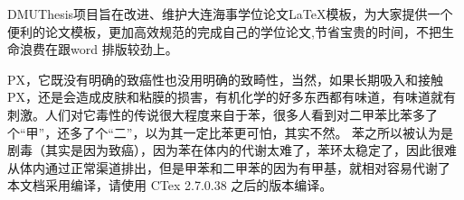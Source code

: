 \begin{abstractCn}
DMUThesis项目旨在改进、维护大连海事学位论文\LaTeX 模板，为大家提供一个便利的论文模板，更加高效规范的完成自己的学位论文,节省宝贵的时间，不把生命浪费在跟word 排版较劲上。

PX，它既没有明确的致癌性也没用明确的致畸性，当然，如果长期吸入和接触PX，还是会造成皮肤和粘膜的损害，有机化学的好多东西都有味道，有味道就有刺激。人们对它毒性的传说很大程度来自于苯，很多人看到对二甲苯比苯多了个“甲”，还多了个“二”，以为其一定比苯更可怕，其实不然。 
苯之所以被认为是剧毒（其实是因为致癌），因为苯在体内的代谢太难了，苯环太稳定了，因此很难从体内通过正常渠道排出，但是甲苯和二甲苯的因为有甲基，就相对容易代谢了
本文档采用\XeLaTeX 编译，请使用 CTex 2.7.0.38 之后的版本编译。

\end{abstractCn}

